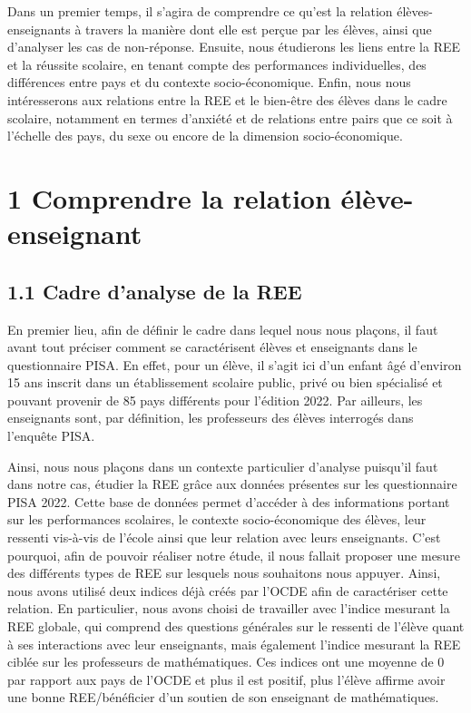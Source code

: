 \documentclass[
  french,
  11pt,
  a4paper,
  oneside]{report}
\begin{document}
Dans un premier temps, il s'agira de comprendre ce qu'est la relation
élèves-enseignants à travers la manière dont elle est perçue par les
élèves, ainsi que d'analyser les cas de non-réponse. Ensuite, nous
étudierons les liens entre la REE et la réussite scolaire, en tenant
compte des performances individuelles, des différences entre pays et du
contexte socio-économique. Enfin, nous nous intéresserons aux relations
entre la REE et le bien-être des élèves dans le cadre scolaire,
notamment en termes d'anxiété et de relations entre pairs que ce soit à
l'échelle des pays, du sexe ou encore de la dimension socio-économique.

\chapter{1 Comprendre la relation
élève-enseignant}\label{comprendre-la-relation-uxe9luxe8ve-enseignant}

\section{1.1 Cadre d'analyse de la REE}\label{cadre-danalyse-de-la-ree}

En premier lieu, afin de définir le cadre dans lequel nous nous plaçons,
il faut avant tout préciser comment se caractérisent élèves et
enseignants dans le questionnaire PISA. En effet, pour un élève, il
s'agit ici d'un enfant âgé d'environ 15 ans inscrit dans un
établissement scolaire public, privé ou bien spécialisé et pouvant
provenir de 85 pays différents pour l'édition 2022. Par ailleurs, les
enseignants sont, par définition, les professeurs des élèves interrogés
dans l'enquête PISA.

Ainsi, nous nous plaçons dans un contexte particulier d'analyse
puisqu'il faut dans notre cas, étudier la REE grâce aux données
présentes sur les questionnaire PISA 2022. Cette base de données permet
d'accéder à des informations portant sur les performances scolaires, le
contexte socio-économique des élèves, leur ressenti vis-à-vis de l'école
ainsi que leur relation avec leurs enseignants. C'est pourquoi, afin de
pouvoir réaliser notre étude, il nous fallait proposer une mesure des
différents types de REE sur lesquels nous souhaitons nous appuyer.
Ainsi, nous avons utilisé deux indices déjà créés par l'OCDE afin de
caractériser cette relation. En particulier, nous avons choisi de
travailler avec l'indice mesurant la REE globale, qui comprend des
questions générales sur le ressenti de l'élève quant à ses interactions
avec leur enseignants, mais également l'indice mesurant la REE ciblée
sur les professeurs de mathématiques. Ces indices ont une moyenne de 0
par rapport aux pays de l'OCDE et plus il est positif, plus l'élève
affirme avoir une bonne REE/bénéficier d'un soutien de son enseignant de
mathématiques.
\end{document}
